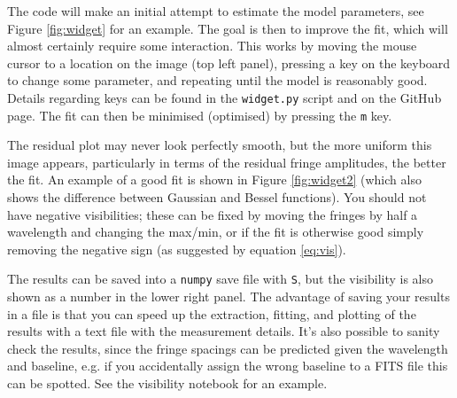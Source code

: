 \documentclass[11pt]{article}
\begin{document}
The code will make an initial attempt to estimate the model parameters, see Figure \ref{fig:widget} for an example. The goal is then to improve the fit, which will almost certainly require some interaction. This works by moving the mouse cursor to a location on the image (top left panel), pressing a key on the keyboard to change some parameter, and repeating until the model is reasonably good. Details regarding keys can be found in the \texttt{widget.py} script and on the GitHub page. The fit can then be minimised (optimised) by pressing the \texttt{m} key.

The residual plot may never look perfectly smooth, but the more uniform this image appears, particularly in terms of the residual fringe amplitudes, the better the fit. An example of a good fit is shown in Figure \ref{fig:widget2} (which also shows the difference between Gaussian and Bessel functions). You should not have negative visibilities; these can be fixed by moving the fringes by half a wavelength and changing the max/min, or if the fit is otherwise good simply removing the negative sign (as suggested by equation \ref{eq:vis}).

The results can be saved into a \texttt{numpy} save file with \texttt{S}, but the visibility is also shown as a number in the lower right panel. The advantage of saving your results in a file is that you can speed up the extraction, fitting, and plotting of the results with a text file with the measurement details. It's also possible to sanity check the results, since the fringe spacings can be predicted given the wavelength and baseline, e.g. if you accidentally assign the wrong baseline to a FITS file this can be spotted. See the visibility notebook for an example.
\end{document}
